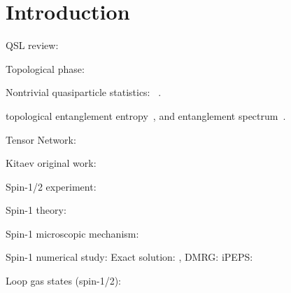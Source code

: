 \documentclass{ntuthesis}
\newcommand{\citep}{\cite}
\begin{document}
\frontmatter

\makecover

\ifdefined\excludefirstpage

  \ifdefined\withwatermark
    \newsavebox\mybox
    \savebox{}
    \newwatermark*[allpages,xpos=6.1725cm,ypos=10.5225cm,scale=0.5]{\usebox\mybox}
  \fi

  \ifdefined\withdoi
    \insertdoi
  \fi
\fi

\makecertification




\tableofcontents
\listoffigures
\listoftables

\mainmatter

%
\chapter{Introduction}
\label{c:intro}

QSL review:
\cite{Savary_2016, RevModPhys.89.025003, Broholmeaay0668}

Topological phase:
~\cite{Wen1989,Wen1990}

Nontrivial quasiparticle statistics:
~\cite{wen_1990,Wen1993,KITAEV20062, Bais_2012, Zhang_2012}.

topological entanglement entropy~\cite{ Kitaev2006, Levin2006,Xie_2010}, and  entanglement spectrum~\cite{Haldane_2008,Pollmann_2010,Turner_2011}.

Tensor Network:
\citep{2008_PEPS}


Kitaev original work:
\citep{Kitaev2006}

Spin-1/2 experiment:
\citep{PhysRevLett.108.127203, doi:10.1146/annurev-conmatphys-020911-125138,doi:10.1146/annurev-conmatphys-031115-011319, Winter_2017, PhysRevB.90.041112, Kasahara_2018}

Spin-1 theory:
\citep{Baskaran_2008,PhysRevB.99.104408, PhysRevB.98.214404}

Spin-1 microscopic mechanism:
\citep{PhysRevLett.123.037203}

Spin-1 numerical study:
Exact solution: \citep{2018_exact_spin1},
DMRG: \citep{2018_Kitaev_QSL,PhysRevB.102.121102,PhysRevResearch.2.022047,PhysRevResearch.3.013160}
iPEPS: \citep{2020-spin-one-kitaev,lee2020anisotropy}

Loop gas states (spin-1/2):
\citep{spin_one_half, non-AbelianTO_2020, Lee_2020}
\end{document}
